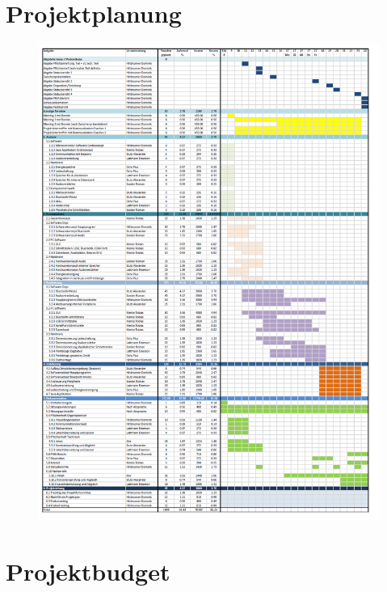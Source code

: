 \documentclass[10pt,a4paper,oneside]{99_fhnwreport}
\begin{document}
\section{Projektplanung}\label{sec:projektplanung}
\begin{figure}[htbp]
	\centering
	\includegraphics[width=13.5cm]{projektplan.png}
\end{figure}
\newpage
\section{Projektbudget}\label{sec:projektbudget}
\end{document}
